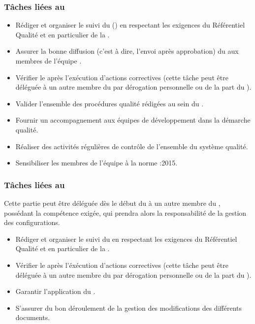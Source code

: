 \subsubsection*{Tâches liées au \PQCourt}
\begin{itemize}
	\item Rédiger et organiser le suivi du \PQ (\PQCourt) en respectant les exigences du Référentiel Qualité et en particulier de la \DGQDEUXCourt.
	\item Assurer la bonne diffusion (c’est à dire, l’envoi après approbation) du \PQCourt aux membres de l’équipe \PICCourt.
	\item Vérifier le \PQCourt après l’exécution d’actions correctives (cette tâche peut être déléguée à un autre membre du \PICCourt par dérogation personnelle ou de la part du \CP).
	\item Valider l’ensemble des procédures qualité rédigées au sein du \PICCourt.
	\item Fournir un accompagnement aux équipes de développement dans la démarche qualité.
	\item Réaliser des activités régulières de contrôle de l’ensemble du système qualité.
	\item Sensibiliser les membres de l’équipe \PICCourt à la norme :2015.
\end{itemize}

\subsubsection*{Tâches liées au \PGCCourt}

Cette partie peut être déléguée dès le début du \PICCourt à un autre membre du \PICCourt, possédant la compétence exigée, qui prendra alors la responsabilité de la gestion des configurations.

\begin{itemize}
	\item Rédiger et organiser le suivi du \PGCCourt en respectant les exigences du Référentiel Qualité et en particulier de la \DGQDEUXCourt.
	\item Vérifier le \PGCCourt après l’éxécution d’actions correctives (cette tâche peut être déléguée à un autre membre du \PICCourt par dérogation personnelle ou de la part du \CP).
	\item Garantir l’application du \PGCCourt.
	\item S’assurer du bon déroulement de la gestion des modifications des différents documents.
\end{itemize}

